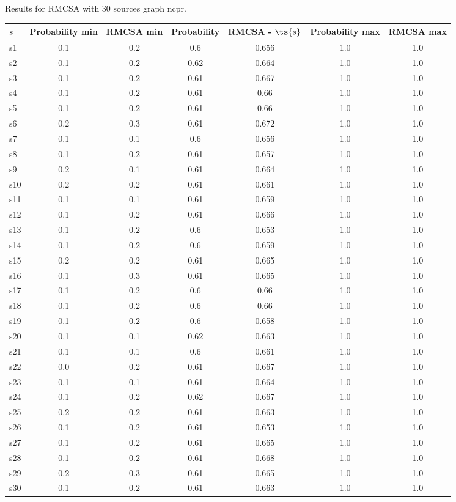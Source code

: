 \documentclass{article}
\begin{document}
\noindent Results for RMCSA with 30 sources graph ncpr.

\noindent\begin{tabular}{|l|c|c|c|c|c|c|}
\hline
$s$& Probability min & RMCSA min & Probability & RMCSA - $\ts{s}$ & Probability max & RMCSA max\\
\hline
s1 &0.1 & 0.2 & 0.6 & 0.656 & 1.0 & 1.0\\
\hline
s2 &0.1 & 0.2 & 0.62 & 0.664 & 1.0 & 1.0\\
\hline
s3 &0.1 & 0.2 & 0.61 & 0.667 & 1.0 & 1.0\\
\hline
s4 &0.1 & 0.2 & 0.61 & 0.66 & 1.0 & 1.0\\
\hline
s5 &0.1 & 0.2 & 0.61 & 0.66 & 1.0 & 1.0\\
\hline
s6 &0.2 & 0.3 & 0.61 & 0.672 & 1.0 & 1.0\\
\hline
s7 &0.1 & 0.1 & 0.6 & 0.656 & 1.0 & 1.0\\
\hline
s8 &0.1 & 0.2 & 0.61 & 0.657 & 1.0 & 1.0\\
\hline
s9 &0.2 & 0.1 & 0.61 & 0.664 & 1.0 & 1.0\\
\hline
s10 &0.2 & 0.2 & 0.61 & 0.661 & 1.0 & 1.0\\
\hline
s11 &0.1 & 0.1 & 0.61 & 0.659 & 1.0 & 1.0\\
\hline
s12 &0.1 & 0.2 & 0.61 & 0.666 & 1.0 & 1.0\\
\hline
s13 &0.1 & 0.2 & 0.6 & 0.653 & 1.0 & 1.0\\
\hline
s14 &0.1 & 0.2 & 0.6 & 0.659 & 1.0 & 1.0\\
\hline
s15 &0.2 & 0.2 & 0.61 & 0.665 & 1.0 & 1.0\\
\hline
s16 &0.1 & 0.3 & 0.61 & 0.665 & 1.0 & 1.0\\
\hline
s17 &0.1 & 0.2 & 0.6 & 0.66 & 1.0 & 1.0\\
\hline
s18 &0.1 & 0.2 & 0.6 & 0.66 & 1.0 & 1.0\\
\hline
s19 &0.1 & 0.2 & 0.6 & 0.658 & 1.0 & 1.0\\
\hline
s20 &0.1 & 0.1 & 0.62 & 0.663 & 1.0 & 1.0\\
\hline
s21 &0.1 & 0.1 & 0.6 & 0.661 & 1.0 & 1.0\\
\hline
s22 &0.0 & 0.2 & 0.61 & 0.667 & 1.0 & 1.0\\
\hline
s23 &0.1 & 0.1 & 0.61 & 0.664 & 1.0 & 1.0\\
\hline
s24 &0.1 & 0.2 & 0.62 & 0.667 & 1.0 & 1.0\\
\hline
s25 &0.2 & 0.2 & 0.61 & 0.663 & 1.0 & 1.0\\
\hline
s26 &0.1 & 0.2 & 0.61 & 0.653 & 1.0 & 1.0\\
\hline
s27 &0.1 & 0.2 & 0.61 & 0.665 & 1.0 & 1.0\\
\hline
s28 &0.1 & 0.2 & 0.61 & 0.668 & 1.0 & 1.0\\
\hline
s29 &0.2 & 0.3 & 0.61 & 0.665 & 1.0 & 1.0\\
\hline
s30 &0.1 & 0.2 & 0.61 & 0.663 & 1.0 & 1.0\\
\hline
\end{tabular}\\
\end{document}
